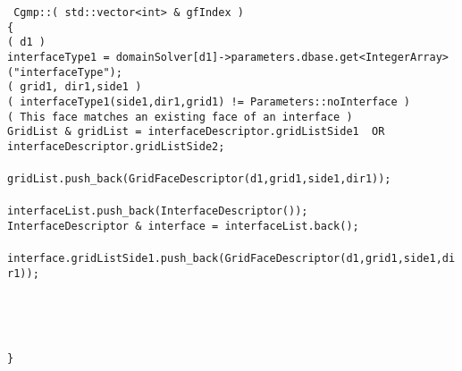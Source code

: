 \begin{flushleft}\tt\small
Cgmp::( std::vector<int> \& gfIndex ) \\
\{  \\
\ia  \ForDomain( d1 )   \\
\ib    interfaceType1 = domainSolver[d1]->parameters.dbase.get<IntegerArray>("interfaceType"); \\
\ib    \FOR( grid1, dir1,side1 ) \\
\ic       \IF( interfaceType1(side1,dir1,grid1) != Parameters::noInterface )  \\
\id         \IF( This face matches an existing face of an interface ) \\
\ie           GridList \& gridList = interfaceDescriptor.gridListSide1 ~OR~ interfaceDescriptor.gridListSide2; \\
\ie           {} \\ 
\ie           gridList.push\_back(GridFaceDescriptor(d1,grid1,side1,dir1)); \\
\id        \ELSE \\
\ie           interfaceList.push\_back(InterfaceDescriptor());   \\ 
\ie           InterfaceDescriptor \& interface =  interfaceList.back();  \\ 
\ie           {} \\ 
\ie           interface.gridListSide1.push\_back(GridFaceDescriptor(d1,grid1,side1,dir1)); \\ 
\id         \END \\
\ic       \END \\
\ib    \END \\
\ia  \END \\

\}
\end{flushleft}



